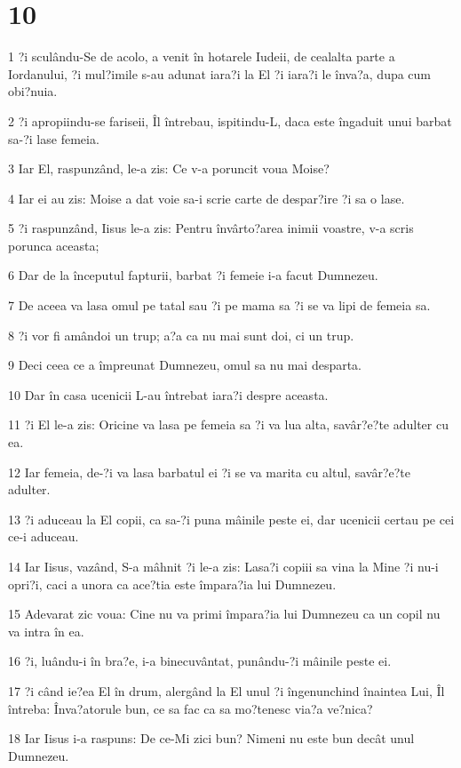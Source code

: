 \chapter{10}

\par 1 ?i sculându-Se de acolo, a venit în hotarele Iudeii, de cealalta parte a Iordanului, ?i mul?imile s-au adunat iara?i la El ?i iara?i le înva?a, dupa cum obi?nuia.
\par 2 ?i apropiindu-se fariseii, Îl întrebau, ispitindu-L, daca este îngaduit unui barbat sa-?i lase femeia.
\par 3 Iar El, raspunzând, le-a zis: Ce v-a poruncit voua Moise?
\par 4 Iar ei au zis: Moise a dat voie sa-i scrie carte de despar?ire ?i sa o lase.
\par 5 ?i raspunzând, Iisus le-a zis: Pentru învârto?area inimii voastre, v-a scris porunca aceasta;
\par 6 Dar de la începutul fapturii, barbat ?i femeie i-a facut Dumnezeu.
\par 7 De aceea va lasa omul pe tatal sau ?i pe mama sa ?i se va lipi de femeia sa.
\par 8 ?i vor fi amândoi un trup; a?a ca nu mai sunt doi, ci un trup.
\par 9 Deci ceea ce a împreunat Dumnezeu, omul sa nu mai desparta.
\par 10 Dar în casa ucenicii L-au întrebat iara?i despre aceasta.
\par 11 ?i El le-a zis: Oricine va lasa pe femeia sa ?i va lua alta, savâr?e?te adulter cu ea.
\par 12 Iar femeia, de-?i va lasa barbatul ei ?i se va marita cu altul, savâr?e?te adulter.
\par 13 ?i aduceau la El copii, ca sa-?i puna mâinile peste ei, dar ucenicii certau pe cei ce-i aduceau.
\par 14 Iar Iisus, vazând, S-a mâhnit ?i le-a zis: Lasa?i copiii sa vina la Mine ?i nu-i opri?i, caci a unora ca ace?tia este împara?ia lui Dumnezeu.
\par 15 Adevarat zic voua: Cine nu va primi împara?ia lui Dumnezeu ca un copil nu va intra în ea.
\par 16 ?i, luându-i în bra?e, i-a binecuvântat, punându-?i mâinile peste ei.
\par 17 ?i când ie?ea El în drum, alergând la El unul ?i îngenunchind înaintea Lui, Îl întreba: Înva?atorule bun, ce sa fac ca sa mo?tenesc via?a ve?nica?
\par 18 Iar Iisus i-a raspuns: De ce-Mi zici bun? Nimeni nu este bun decât unul Dumnezeu.
